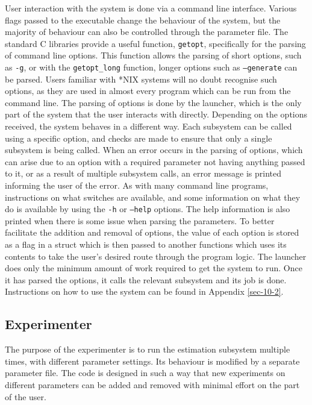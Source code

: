 \documentclass[a4paper,11pt]{article}
\begin{document}
   User interaction with the system is done via a command line
   interface. Various flags passed to the executable change the behaviour of the
   system, but the majority of behaviour can also be controlled through the
   parameter file. The standard C libraries provide a useful function,
   \texttt{getopt}, specifically for the parsing of command line options. This
   function allows the parsing of short options, such as \texttt{-g}, or with
   the \texttt{getopt\_long} function, longer options such as
   \texttt{--generate} can be parsed. Users familiar with *NIX systems will no
   doubt recognise such options, as they are used in almost every program which
   can be run from the command line. The parsing of options is done by the
   launcher, which is the only part of the system that the user interacts with
   directly. Depending on the options received, the system behaves in a
   different way. Each subsystem can be called using a specific option, and
   checks are made to ensure that only a single subsystem is being called. When
   an error occurs in the parsing of options, which can arise due to an option
   with a required parameter not having anything passed to it, or as a result of
   multiple subsystem calls, an error message is printed informing the user of
   the error. As with many command line programs, instructions on what switches
   are available, and some information on what they do is available by using the
   \texttt{-h} or \texttt{--help} options. The help information is also printed
   when there is some issue when parsing the parameters. To better facilitate
   the addition and removal of options, the value of each option is stored as a
   flag in a struct which is then passed to another functions which uses its
   contents to take the user's desired route through the program logic. The
   launcher does only the minimum amount of work required to get the system to
   run. Once it has parsed the options, it calls the relevant subsystem and its
   job is done. Instructions on how to use the system can be found in Appendix
   \ref{sec-10-2}.
\subsection{Experimenter}
\label{sec-3-6}

   The purpose of the experimenter is to run the estimation subsystem multiple
   times, with different parameter settings. Its behaviour is modified by a
   separate parameter file. The code is designed in such a way that new
   experiments on different parameters can be added and removed with minimal
   effort on the part of the user. 
\end{document}
